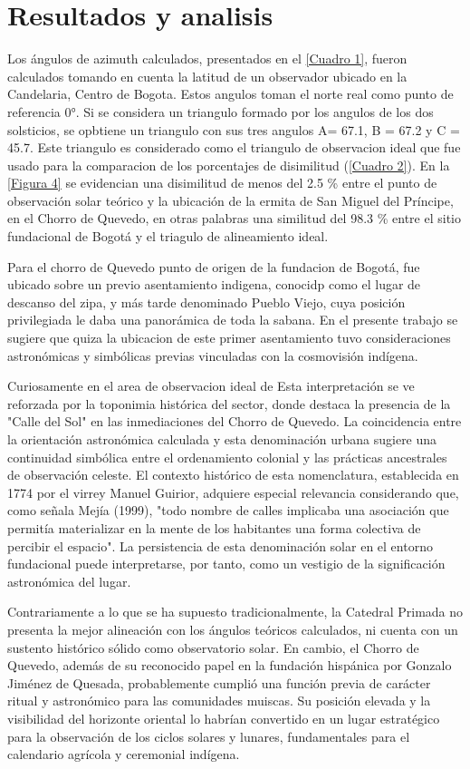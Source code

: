 \documentclass[a4paper,alpha-refs]{eSpectra}
\begin{document}
\section{Resultados y analisis}
Los ángulos de azimuth calculados, presentados en el \autoref{Cuadro 1}, fueron calculados tomando en cuenta la latitud de un observador ubicado en la Candelaria, Centro de Bogota. Estos angulos toman el norte real como punto de referencia 0°. Si se considera un triangulo formado por los angulos de los dos solsticios, se opbtiene un triangulo con sus tres angulos A= 67.1, B = 67.2 y C = 45.7. Este triangulo es considerado como el triangulo de observacion ideal que fue usado para la comparacion de los porcentajes de disimilitud (\autoref{Cuadro 2}). En la \autoref{Figura 4} se evidencian una disimilitud de menos del 2.5 \% entre el punto de observación solar teórico y la ubicación de la ermita de San Miguel del Príncipe, en el Chorro de Quevedo, en otras palabras una similitud del 98.3 \%  entre el sitio fundacional de Bogotá y el triagulo de alineamiento ideal.

Para \cite{martínez1987santafé} el chorro de Quevedo punto de origen de la fundacion de Bogotá, fue ubicado sobre un previo asentamiento indigena, conocidp como el lugar de descanso del zipa, y más tarde denominado Pueblo Viejo, cuya posición privilegiada le daba una panorámica de toda la sabana. En el presente trabajo se sugiere que quiza la ubicacion de este primer asentamiento tuvo  consideraciones astronómicas y simbólicas previas vinculadas con la cosmovisión indígena.

Curiosamente en el area de observacion ideal de Esta interpretación se ve reforzada por la toponimia histórica del sector, donde destaca la presencia de la "Calle del Sol" en las inmediaciones del Chorro de Quevedo. La coincidencia entre la orientación astronómica calculada y esta denominación urbana sugiere una continuidad simbólica entre el ordenamiento colonial y las prácticas ancestrales de observación celeste. El contexto histórico de esta nomenclatura, establecida en 1774 por el virrey Manuel Guirior, adquiere especial relevancia considerando que, como señala Mejía (1999), "todo nombre de calles implicaba una asociación que permitía materializar en la mente de los habitantes una forma colectiva de percibir el espacio". La persistencia de esta denominación solar en el entorno fundacional puede interpretarse, por tanto, como un vestigio de la significación astronómica del lugar.

Contrariamente a lo que se ha supuesto tradicionalmente, la Catedral Primada no presenta la mejor alineación con los ángulos teóricos calculados, ni cuenta con un sustento histórico sólido como observatorio solar. En cambio, el Chorro de Quevedo, además de su reconocido papel en la fundación hispánica por Gonzalo Jiménez de Quesada, probablemente cumplió una función previa de carácter ritual y astronómico para las comunidades muiscas. Su posición elevada y la visibilidad del horizonte oriental lo habrían convertido en un lugar estratégico para la observación de los ciclos solares y lunares, fundamentales para el calendario agrícola y ceremonial indígena.
\end{document}
